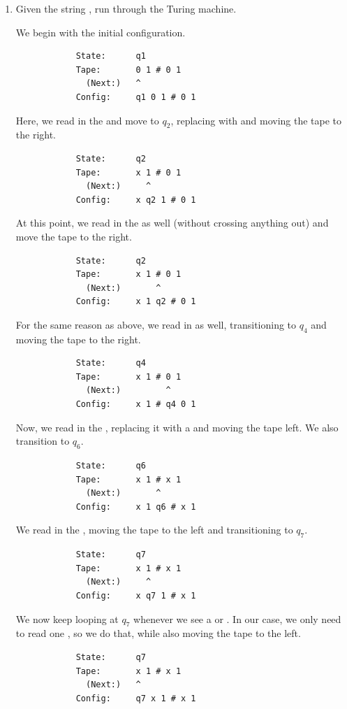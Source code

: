 \documentclass[letterpaper]{article}
\begin{document}
\begin{enumerate}
    \item Given the string , run through the Turing machine. 
    \begin{mdframed}[]
        We begin with the initial configuration. 
        \begin{verbatim}
            State:      q1
            Tape:       0 1 # 0 1
              (Next:)   ^
            Config:     q1 0 1 # 0 1
        \end{verbatim}

        Here, we read in the  and move to $q_2$, replacing  with  and moving the tape to the right. 
        \begin{verbatim}
            State:      q2
            Tape:       x 1 # 0 1
              (Next:)     ^
            Config:     x q2 1 # 0 1
        \end{verbatim}

        At this point, we read in the  as well (without crossing anything out) and move the tape to the right.  
        \begin{verbatim}
            State:      q2
            Tape:       x 1 # 0 1
              (Next:)       ^
            Config:     x 1 q2 # 0 1
        \end{verbatim}

        For the same reason as above, we read in \code{\#} as well, transitioning to $q_4$ and moving the tape to the right.
        \begin{verbatim}
            State:      q4
            Tape:       x 1 # 0 1
              (Next:)         ^
            Config:     x 1 # q4 0 1
        \end{verbatim}

        Now, we read in the , replacing it with a  and moving the tape left. We also transition to $q_6$. 
        \begin{verbatim}
            State:      q6
            Tape:       x 1 # x 1
              (Next:)       ^
            Config:     x 1 q6 # x 1
        \end{verbatim}

        We read in the \code{\#}, moving the tape to the left and transitioning to $q_7$. 
        \begin{verbatim}
            State:      q7
            Tape:       x 1 # x 1
              (Next:)     ^
            Config:     x q7 1 # x 1
        \end{verbatim}

        We now keep looping at $q_7$ whenever we see a  or . In our case, we only need to read one , so we do that, while also moving the tape to the left. 
        \begin{verbatim}
            State:      q7
            Tape:       x 1 # x 1
              (Next:)   ^
            Config:     q7 x 1 # x 1
        \end{verbatim}


\end{mdframed}
\end{enumerate}
\end{document}
